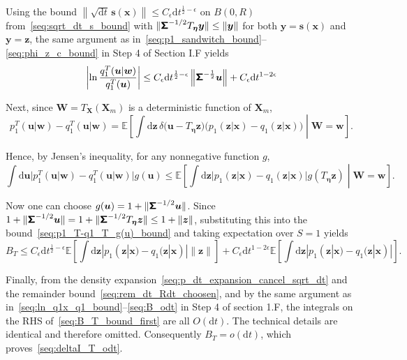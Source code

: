 Using the bound $\left\|\sqrt{\mathrm dt}\,\bm s(\bm x)\right\|\leq
C_{\epsilon}\mathrm dt^{\frac{1}{2}-\epsilon}$ on $B(0,R)$ from~\eqref{seq:sqrt_dt_s_bound} with $\|\boldsymbol{\mathsf{\Sigma}}^{-1/2}T_{\bm\eta}\bm y\|\leq\|\bm y\|$ for both $\bm y=\bm s(\bm x)$ and $\bm y=\bm z$, the same argument as in~\eqref{seq:p1_sandwitch_bound}--\eqref{seq:phi_z_c_bound} in Step 4 of Section I.F yields
\begin{equation}
    \left|\ln\frac{q_1^T(\bm u|\bm w)}{q_1^T(\bm u)}\right|
    \leq C_\epsilon\mathrm dt^{\frac{1}{2}-\epsilon}
    \left\|\boldsymbol{\mathsf{\Sigma}}^{-\frac{1}{2}}\bm u\right\|
    +C_\epsilon\mathrm dt^{1-2\epsilon}
    \label{seq:ln_q1Tw_q1T_bound}
\end{equation}

Next, since $\bm W=T_{\bm X}(\bm X_m)$ is a deterministic function of $\bm X_m$,
\[
    p_1^T(\bm u|\bm w)-q_1^T(\bm u|\bm w)=\mathbb E\!\left[
    \int\mathrm d\bm z\,\delta\big(\bm u-T_{\bm\eta}\bm z\big)
    \big(p_1(\bm z|\bm x)-q_1(\bm z|\bm x)\big)
    \middle|\bm W=\bm w\right].
\]

Hence, by Jensen's inequality, for any nonnegative function $g$,
\begin{equation}
    \int \mathrm d\bm u\big|p_1^T(\bm u|\bm w)-q_1^T(\bm u|\bm w)\big|g(\bm u)
    \leq\mathbb E\!\left[\int\mathrm d\bm z\big|p_1(\bm z|\bm x)-q_1(\bm z|\bm x)\big|g(T_{\bm\eta}\bm z)
    \middle|\bm W=\bm w\right].
    \label{seq:p1_T-q1_T_g(u)_bound}
\end{equation}

Now one can choose $g(\bm u)=1+\|\boldsymbol{\mathsf{\Sigma}}^{-1/2}\bm u\|$. Since $1+\|\boldsymbol{\mathsf{\Sigma}}^{-1/2}\bm u\|=1+\|\boldsymbol{\mathsf{\Sigma}}^{-1/2}T_{\bm\eta}\bm z\|\leq1+\|\bm z\|$, substituting this into the bound~\eqref{seq:p1_T-q1_T_g(u)_bound} and taking expectation over $S=1$ yields
\begin{equation}
    B_T\leq C_\epsilon\mathrm dt^{\frac{1}{2}-\epsilon}\mathbb E\!\left[
    \int\mathrm d\bm z|p_1(\bm z|\bm x)-q_1(\bm z|\bm x)|\|\bm z\|
    \right]
    +C_\epsilon\mathrm dt^{1-2\epsilon}\mathbb E\!\left[
    \int\mathrm d\bm z|p_1(\bm z|\bm x)-q_1(\bm z|\bm x)|\right].
    \label{seq:B_T_bound_first}
\end{equation}

Finally, from the density expansion~\eqref{seq:p_dt_expansion_cancel_sqrt_dt} and the remainder bound~\eqref{seq:rem_dt_Rdt_choosen}, and by the same argument as in~\eqref{seq:ln_q1x_q1_bound}--\eqref{seq:B_odt} in Step 4 of section 1.F, the integrals on the RHS of~\eqref{seq:B_T_bound_first} are all $O(\mathrm dt)$. The technical details are identical and therefore omitted. Consequently $B_T=o(\mathrm dt)$, which proves~\eqref{seq:deltaI_T_odt}.

